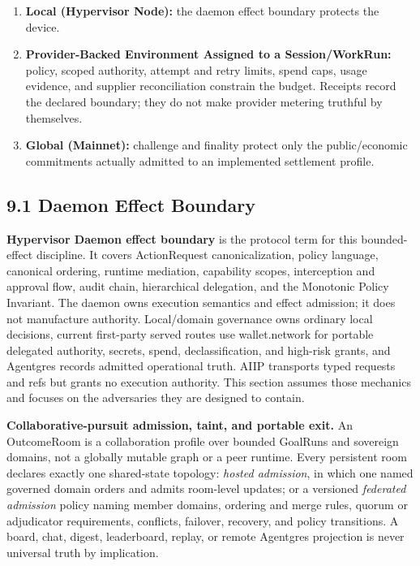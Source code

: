 \documentclass[
  11pt,
]{article}
\providecommand{\tightlist}{%
  \setlength{\itemsep}{0pt}\setlength{\parskip}{0pt}}
\begin{document}
\begin{enumerate}
\def\labelenumi{\arabic{enumi}.}
\tightlist
\item
  \textbf{Local (Hypervisor Node):} the daemon effect boundary protects the
  device.
\item
  \textbf{Provider-Backed Environment Assigned to a Session/WorkRun:} policy,
  scoped authority,
  attempt and retry limits, spend caps, usage evidence, and supplier
  reconciliation constrain the budget. Receipts record the declared boundary;
  they do not make provider metering truthful by themselves.
\item
  \textbf{Global (Mainnet):} challenge and finality protect only the
  public/economic commitments actually admitted to an implemented
  settlement profile.
\end{enumerate}

\hypertarget{daemon-effect-boundary}{%
\subsection{9.1 Daemon Effect Boundary}\label{daemon-effect-boundary}}

\textbf{Hypervisor Daemon effect boundary} is the protocol term for this
bounded-effect discipline. It covers ActionRequest canonicalization,
policy language, canonical ordering,
runtime mediation, capability scopes, interception and approval flow,
audit chain, hierarchical delegation, and the Monotonic Policy
Invariant. The daemon owns execution semantics and effect admission; it does
not manufacture authority. Local/domain governance owns ordinary local
decisions, current first-party served routes use wallet.network for portable
delegated authority, secrets, spend, declassification, and high-risk grants,
and Agentgres records admitted
operational truth. AIIP transports typed requests and refs but grants no
execution authority. This section assumes those
mechanics and focuses on the adversaries they are designed to contain.

\textbf{Collaborative-pursuit admission, taint, and portable exit.} An
OutcomeRoom is a collaboration profile over bounded GoalRuns and sovereign
domains, not a globally mutable graph or a peer runtime. Every persistent
room declares exactly one shared-state topology: \emph{hosted admission}, in
which one named governed domain orders and admits room-level updates; or a
versioned \emph{federated admission} policy naming member domains, ordering
and merge rules, quorum or adjudicator requirements, conflicts, failover,
recovery, and policy transitions. A board, chat, digest, leaderboard, replay,
or remote Agentgres projection is never universal truth by implication.
\end{document}
